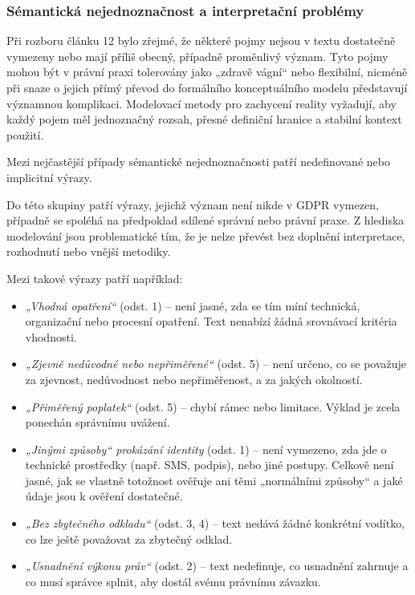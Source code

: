 
\subsubsection{Sémantická nejednoznačnost a interpretační problémy}
\label{sec:semanticka-nejednoznacnost}
Při rozboru článku 12 bylo zřejmé, že některé pojmy nejsou v textu dostatečně vymezeny nebo mají příliš obecný, případně proměnlivý význam. Tyto pojmy mohou být v právní praxi tolerovány jako „zdravě vágní“ nebo flexibilní, nicméně při snaze o jejich přímý převod do formálního konceptuálního modelu představují významnou komplikaci. Modelovací metody pro zachycení reality vyžadují, aby každý pojem měl jednoznačný rozsah, přesné definiční hranice a stabilní kontext použití.
  
Mezi nejčastější případy sémantické nejednoznačnosti patří nedefinované nebo implicitní výrazy.

Do této skupiny patří výrazy, jejichž význam není nikde v GDPR vymezen, případně se spoléhá na předpoklad sdílené správní nebo právní praxe. Z hlediska modelování jsou problematické tím, že je nelze převést bez doplnění interpretace, rozhodnutí nebo vnější metodiky.

Mezi takové výrazy patří například:
\begin{itemize}
  \item \textit{„Vhodná opatření“} (odst. 1) – není jasné, zda se tím míní technická, organizační nebo procesní opatření. Text nenabízí žádná srovnávací kritéria vhodnosti.
  \item \textit{„Zjevně nedůvodné nebo nepřiměřené“} (odst. 5) – není určeno, co se považuje za zjevnost, nedůvodnost nebo nepřiměřenost, a za jakých okolností.
  \item \textit{„Přiměřený poplatek“} (odst. 5) – chybí rámec nebo limitace. Výklad je zcela ponechán správnímu uvážení.
  \item \textit{„Jinými způsoby“ prokázání identity} (odst. 1) – není vymezeno, zda jde o technické prostředky (např. SMS, podpis), nebo jiné postupy. Celkově není jasné, jak se vlastně totožnost ověřuje ani těmi „normálními způsoby“ a jaké údaje jsou k ověření dostatečné.
  \item \textit{„Bez zbytečného odkladu“} (odst. 3, 4) – text nedává žádné konkrétní vodítko, co lze ještě považovat za zbytečný odklad.
  \item \textit{„Usnadnění výkonu práv“} (odst. 2) – text nedefinuje, co usnadnění zahrnuje a co musí správce splnit, aby dostál svému právnímu závazku.
\end{itemize}

